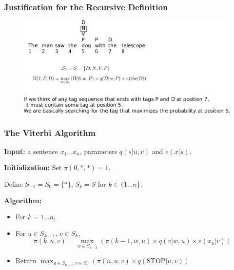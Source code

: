 \documentclass[handout]{beamer}
\begin{document}
\begin{frame}
  \frametitle{Justification for the Recursive Definition}

  \begin{figure}[h]
        	\includegraphics[scale = 0.65]{pics/viterbi2.pdf}
        \end{figure}
\end{frame}

\begin{frame}
  \frametitle{The Viterbi Algorithm}
  
  
  
  
  \textbf{Input:} a sentence $x_1 \ldots x_n$, parameters $q(s|u, v)$ and $e(x|s)$.

  \textbf{Initialization:} Set $\pi(0, *, *) = 1$.

  Define $S_{-1} = S_0 = \{*\}$, $S_k = S$ for $k \in \{1 \ldots n\}$.

  \textbf{Algorithm:}
  \begin{itemize}
    \item For $k = 1 \ldots n$,
    \item For $u \in S_{k-1}$, $v \in S_k$,
    \[
      \pi(k, u, v) = \max_{w \in S_{k-2}} (\pi(k - 1, w, u) \times q(v|w, u) \times e(x_k|v))
    \]
    \item Return $\max_{u \in S_{n-1}, v \in S_n} (\pi(n, u, v) \times q(\text{STOP}|u, v))$
  \end{itemize}
\end{frame}
\end{document}
